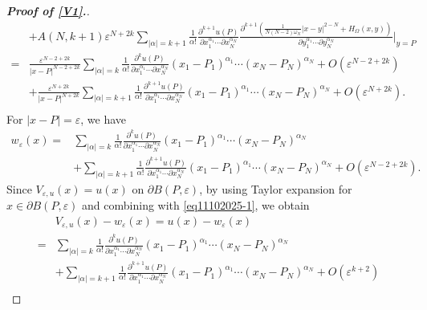 \documentclass[11pt,reqno]{article}
\numberwithin{equation}{section}
\newcommand\e\varepsilon
\begin{document}
\begin{proof}[\bf Proof of \eqref{V1}.]
\begin{align*}
                    &+A(N,k+1)\e^{N+2k}
					\sum_{|\alpha|=k+1}\frac1{\alpha!}
					\frac{\partial^{k+1}u(P)}{\partial x_1^{\alpha_1}\cdots\partial x_N^{\alpha_N}}
					\frac{\partial^{k+1}\left(\frac1{N(N-2)\omega_N}|x-y|^{2-N}+H_{\Omega}(x,y)\right)}{\partial y_1^{\alpha_1}\cdots\partial y_N^{\alpha_N}}\Bigg|_{y=P}\\
                    =&\frac{\e^{N-2+2k}}{|x-P|^{N-2+2k}}\sum_{|\alpha|=k}\frac1{\alpha!}
					\frac{\partial^ku(P)}{\partial x_1^{\alpha_1}\cdots\partial x_N^{\alpha_N}}(x_1-P_1)^{\alpha_1}\cdots(x_N-P_N)^{\alpha_N}+O(\e^{N-2+2k})\\
                    &+\frac{\e^{N+2k}}{|x-P|^{N+2k}}\sum_{|\alpha|=k+1}\frac1{\alpha!}
					\frac{\partial^{k+1}u(P)}{\partial x_1^{\alpha_1}\cdots\partial x_N^{\alpha_N}}(x_1-P_1)^{\alpha_1}\cdots(x_N-P_N)^{\alpha_N}+O(\e^{N+2k}).\\
				\end{align*}
                For $|x-P|=\e$, we have
                \begin{equation}\label{eq11102025-1}
                    \begin{aligned}
                    w_\e(x)=&\sum_{|\alpha|=k}\frac1{\alpha!}
					\frac{\partial^ku(P)}{\partial x_1^{\alpha_1}\cdots\partial x_N^{\alpha_N}}(x_1-P_1)^{\alpha_1}\cdots(x_N-P_N)^{\alpha_N}\\
                    &+\sum_{|\alpha|=k+1}\frac1{\alpha!}
					\frac{\partial^{k+1}u(P)}{\partial x_1^{\alpha_1}\cdots\partial x_N^{\alpha_N}}(x_1-P_1)^{\alpha_1}\cdots(x_N-P_N)^{\alpha_N}+O(\e^{N-2+2k}).
                    \end{aligned}
                \end{equation}
Since $V_{\e,u}(x)=u(x)$ on $\partial B(P,\e)$, by using Taylor expansion for $x\in\partial B(P,\e)$ and combining with \eqref{eq11102025-1}, we obtain
\begin{equation}\label{eq1901-1}
			\begin{aligned}
				&V_{\e,u}(x)-w_\e(x)=u(x)-w_\e(x)\\
				=&\sum_{|\alpha|=k}\frac1{\alpha!}
					\frac{\partial^ku(P)}{\partial x_1^{\alpha_1}\cdots\partial x_N^{\alpha_N}}(x_1-P_1)^{\alpha_1}\cdots(x_N-P_N)^{\alpha_N}\\
                    &+\sum_{|\alpha|=k+1}\frac1{\alpha!}
					\frac{\partial^{k+1}u(P)}{\partial x_1^{\alpha_1}\cdots\partial x_N^{\alpha_N}}(x_1-P_1)^{\alpha_1}\cdots(x_N-P_N)^{\alpha_N}+O(\e^{k+2})\\

\end{aligned}
\end{equation}
\end{proof}
\end{document}
